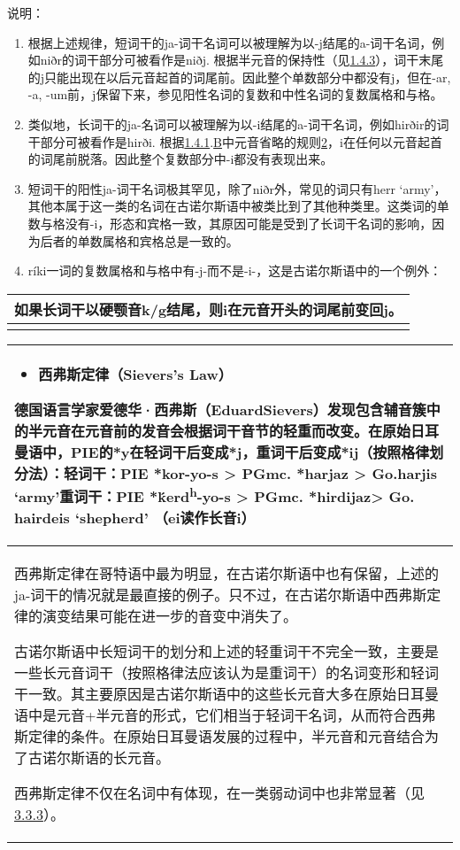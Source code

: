 说明：

\begin{enumerate}
\def\labelenumi{\arabic{enumi})}
\item
  根据上述规律，短词干的ja-词干名词可以被理解为以-j结尾的a-词干名词，例如niðr的词干部分可被看作是niðj.
  根据半元音的保持性（见\hyperref[ux534aux5143ux97f3ux7684ux4fddux6301ux6027]{1.4.3}），词干末尾的j只能出现在以后元音起首的词尾前。因此整个单数部分中都没有j，但在-ar,
  -a, -um前，j保留下来，参见阳性名词的复数和中性名词的复数属格和与格。
\item
  类似地，长词干的ja-名词可以被理解为以-i结尾的a-词干名词，例如hirðir的词干部分可被看作是hirði.
  根据\hyperref[ux5143ux97f3ux7684ux97f3ux53d8]{1.4.1}.\hyperref[_Ref115693879]{B}中元音省略的规则\hyperref[_Ref115709879]{2}，i在任何以元音起首的词尾前脱落。因此整个复数部分中-i都没有表现出来。
\item
  短词干的阳性ja-词干名词极其罕见，除了niðr外，常见的词只有herr
  `army'，其他本属于这一类的名词在古诺尔斯语中被类比到了其他种类里。这类词的单数与格没有-i，形态和宾格一致，其原因可能是受到了长词干名词的影响，因为后者的单数属格和宾格总是一致的。
\item
  ríki一词的复数属格和与格中有-j-而不是-i-，这是古诺尔斯语中的一个例外：
\end{enumerate}

\begin{longtable}{l}
\toprule
如果长词干以硬颚音k/g结尾，则i在元音开头的词尾前变回j。 \\
\midrule
\endhead
\bottomrule
\endfoot
\end{longtable}

\begin{longtable}{l}
\toprule
\begin{itemize}\item  西弗斯定律（Sievers\textbf{'}s Law）\end{itemize}德国语言学家爱德华·西弗斯（EduardSievers）发现包含辅音簇中的半元音在元音前的发音会根据词干音节的轻重而改变。在原始日耳曼语中，PIE的*y在\textbf{轻词干}后变成*j，\textbf{重词干}后变成*ij（按照格律划分法）：轻词干：PIE *kor-yo-s \textgreater{} PGmc. *harjaz \textgreater{} Go.harjis `army'重词干：PIE *ḱerd\textsuperscript{h}-yo-s \textgreater{} PGmc. *hirdijaz\textgreater{} Go. hairdeis `shepherd' （ei读作长音i） \\
\midrule
\endhead
\bottomrule
\endfoot
西弗斯定律在哥特语中最为明显，在古诺尔斯语中也有保留，上述的ja-词干的情况就是最直接的例子。只不过，在古诺尔斯语中西弗斯定律的演变结果可能在进一步的音变中消失了。

古诺尔斯语中长短词干的划分和上述的轻重词干不完全一致，主要是一些长元音词干（按照格律法应该认为是重词干）的名词变形和轻词干一致。其主要原因是古诺尔斯语中的这些长元音大多在原始日耳曼语中是元音+半元音的形式，它们相当于轻词干名词，从而符合西弗斯定律的条件。在原始日耳曼语发展的过程中，半元音和元音结合为了古诺尔斯语的长元音。

西弗斯定律不仅在名词中有体现，在一类弱动词中也非常显著（见\hyperref[ux7b2cux4e00ux5f31ux53d8ux4f4dux6cd5]{3.3.3}）。 \\
\end{longtable}

